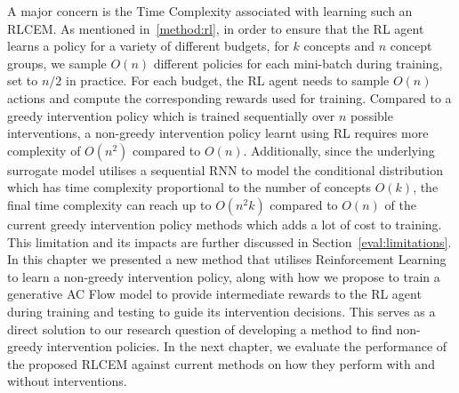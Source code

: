 A major concern is the Time Complexity associated with learning
such an RLCEM. As mentioned in~\ref{method:rl}, in order to ensure
that the RL agent learns a policy for a variety of different budgets,
for $k$ concepts and $n$ concept groups,
 we sample $O(n)$ different policies for each mini-batch during training, set 
to $n/2$ in practice. For each budget, the RL agent needs to sample
$O(n)$ actions and compute the corresponding rewards used for training. 
Compared to
a greedy intervention policy which is trained sequentially over
$n$ possible interventions, 
a non-greedy intervention policy learnt using
RL requires more complexity of $O(n^2)$ compared to $O(n)$.
Additionally, since the underlying surrogate model utilises a sequential
RNN to model the conditional distribution which has time complexity
proportional to the number of concepts $O(k)$, the final 
time complexity can reach up to $O(n^2k)$ compared to $O(n)$ of the current
greedy intervention policy methods which adds a lot of cost to training.
This limitation
and its impacts
are further discussed in Section~\ref{eval:limitations}.\\

In this chapter we presented a new method 
that utilises Reinforcement Learning
to learn a non-greedy intervention policy,
along with how we propose 
to train a generative AC Flow model to
provide intermediate rewards to the RL agent during
training and testing to guide its intervention decisions.
This serves as a direct solution to our research question of 
developing a method to find non-greedy intervention policies.
In the next chapter, we evaluate the performance of the proposed
RLCEM against current methods on how
they perform with and without interventions.


